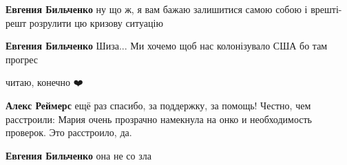 \begin{itemize}
\begin{itemize}
 
\textbf{Евгения Бильченко} ну що ж, я вам бажаю залишитися самою собою і врешті-решт розрулити цю кризову ситуацію

 
\textbf{Евгения Бильченко} Шиза... Ми хочемо щоб нас колонізувало США бо там прогрес

\end{itemize}

 
читаю, конечно ❤️

\begin{itemize}
 
\textbf{Алекс Реймерс} ещё раз спасибо, за поддержку, за помощь! Честно, чем расстроили: Мария очень прозрачно намекнула на онко и необходимость проверок. Это расстроило, да.

 
\textbf{Евгения Бильченко} она не со зла

 

\end{itemize}
\end{itemize}
